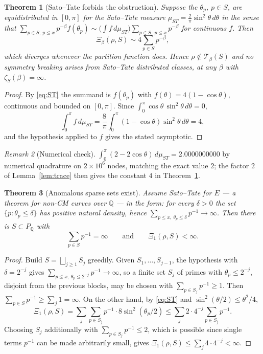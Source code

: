 \documentclass[11pt]{amsart}
\numberwithin{equation}{section}
\newtheorem{theorem}{Theorem}[section]
\theoremstyle{definition}
\theoremstyle{remark}
\newtheorem{remark}[theorem]{Remark}
\newcommand{\Q}{\mathbb{Q}}
\newcommand{\cT}{\mathcal{T}}
\begin{document}
\begin{theorem}[Sato--Tate forbids the obstruction]\label{thm:ST}
Suppose the $\theta_p$, $p\in S$, are equidistributed in $[0,\pi]$ for the Sato--Tate measure
$\mu_{ST}=\tfrac2\pi\sin^2\theta\,d\theta$ in the sense that
$\sum_{p\in S,\ p\le x}p^{-\beta}f(\theta_p)\sim\bigl(\int f\,d\mu_{ST}\bigr)\sum_{p\in S,\ p\le x}p^{-\beta}$
for continuous $f$. Then
\[
\Xi_\beta(\rho,S)\sim4\sum_{p\in S}p^{-\beta},
\]
which diverges whenever the partition function does. Hence $\rho\notin\cT_\beta(S)$ and no
symmetry breaking arises from Sato--Tate distributed classes, at any $\beta$ with
$\zeta_S(\beta)=\infty$.
\end{theorem}

\begin{proof}
By \eqref{eq:ST} the summand is $f(\theta_p)$ with $f(\theta)=4(1-\cos\theta)$, continuous
and bounded on $[0,\pi]$. Since $\int_0^\pi\cos\theta\,\sin^2\theta\,d\theta=0$,
\[
\int_0^\pi f\,d\mu_{ST}=\frac{8}{\pi}\int_0^\pi(1-\cos\theta)\sin^2\theta\,d\theta=4 ,
\]
and the hypothesis applied to $f$ gives the stated asymptotic.
\end{proof}

\begin{remark}[Numerical check]\label{rem:num2}
$\int_0^\pi(2-2\cos\theta)\,d\mu_{ST}=2.0000000000$ by numerical quadrature on $2\times10^6$
nodes, matching the exact value $2$; the factor $2$ of Lemma~\ref{lem:trace} then gives the
constant $4$ in Theorem~\ref{thm:ST}.
\end{remark}

\begin{theorem}[Anomalous sparse sets exist]\label{thm:anomalous}
Assume Sato--Tate for $E$ --- a theorem for non-CM curves over $\Q$ \cite{Taylor} --- in
the form: for every $\delta>0$ the set $\{p:\theta_p\le\delta\}$ has positive natural
density, hence
$\sum_{p\le x,\ \theta_p\le\delta}p^{-1}\to\infty$. Then there is $S\subset P_\Q$ with
\[
\sum_{p\in S}p^{-1}=\infty
\qquad\text{and}\qquad
\Xi_1(\rho,S)<\infty .
\]
\end{theorem}

\begin{proof}
Build $S=\bigsqcup_{j\ge1}S_j$ greedily. Given $S_1,\dots,S_{j-1}$, the hypothesis with
$\delta=2^{-j}$ gives $\sum_{p\le x,\ \theta_p\le2^{-j}}p^{-1}\to\infty$, so a finite set
$S_j$ of primes with $\theta_p\le2^{-j}$, disjoint from the previous blocks, may be chosen
with $\sum_{p\in S_j}p^{-1}\ge1$. Then $\sum_{p\in S}p^{-1}\ge\sum_j1=\infty$. On the other
hand, by \eqref{eq:ST} and $\sin^2(\theta/2)\le\theta^2/4$,
\[
\Xi_1(\rho,S)=\sum_j\sum_{p\in S_j}p^{-1}\cdot8\sin^2(\theta_p/2)
\le\sum_j2\cdot4^{-j}\sum_{p\in S_j}p^{-1} .
\]
Choosing $S_j$ additionally with $\sum_{p\in S_j}p^{-1}\le2$, which is possible since single
terms $p^{-1}$ can be made arbitrarily small, gives $\Xi_1(\rho,S)\le\sum_j4\cdot4^{-j}<\infty$.
\end{proof}
\end{document}
